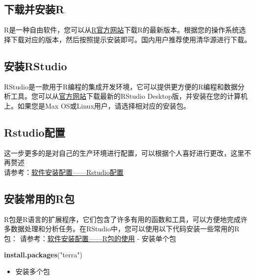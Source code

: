 \documentclass[
]{book}
\newenvironment{Shaded}{\begin{snugshade}}{\end{snugshade}}
\newcommand{\FunctionTok}[1]{\textcolor[rgb]{0.13,0.29,0.53}{\textbf{#1}}}
\newcommand{\NormalTok}[1]{#1}
\newcommand{\StringTok}[1]{\textcolor[rgb]{0.31,0.60,0.02}{#1}}
\providecommand{\tightlist}{%
  \setlength{\itemsep}{0pt}\setlength{\parskip}{0pt}}
\begin{document}
\hypertarget{ux4e0bux8f7dux5e76ux5b89ux88c5r}{%
\subsection{下载并安装R}\label{ux4e0bux8f7dux5e76ux5b89ux88c5r}}

R是一种自由软件，您可以从\href{https://www.r-project.org}{R官方网站}下载R的最新版本。根据您的操作系统选择下载对应的版本，然后按照提示安装即可。国内用户推荐使用清华源进行下载。

\hypertarget{ux5b89ux88c5rstudio}{%
\subsection{安装RStudio}\label{ux5b89ux88c5rstudio}}

RStudio是一款用于R编程的集成开发环境，它可以提供更方便的R编程和数据分析工具。您可以从\href{https://www.rstudio.com/}{官方网站}下载最新的RStudio Desktop版，并安装在您的计算机上。如果您是Max OS或Linux用户，请选择相对应的安装包。

\hypertarget{rstudioux914dux7f6e}{%
\subsection{Rstudio配置}\label{rstudioux914dux7f6e}}

这一步更多的是对自己的生产环境进行配置，可以根据个人喜好进行更改，这里不再赘述\\
请参考：\href{https://www.jianshu.com/p/d5360a387311}{软件安装配置------Rstudio配置}

\hypertarget{ux5b89ux88c5ux5e38ux7528ux7684rux5305}{%
\subsection{安装常用的R包}\label{ux5b89ux88c5ux5e38ux7528ux7684rux5305}}

R包是R语言的扩展程序，它们包含了许多有用的函数和工具，可以方便地完成许多数据处理和分析任务。在RStudio中，您可以使用以下代码安装一些常用的R包：
请参考：\href{https://www.jianshu.com/p/5a066d66d3d3}{软件安装配置------R包的使用}
- 安装单个包

\begin{Shaded}
\begin{Highlighting}[]
\FunctionTok{install.packages}\NormalTok{(}\StringTok{"terra"}\NormalTok{)}
\end{Highlighting}
\end{Shaded}

\begin{itemize}
\tightlist
\item
  安装多个包
\end{itemize}
\end{document}
